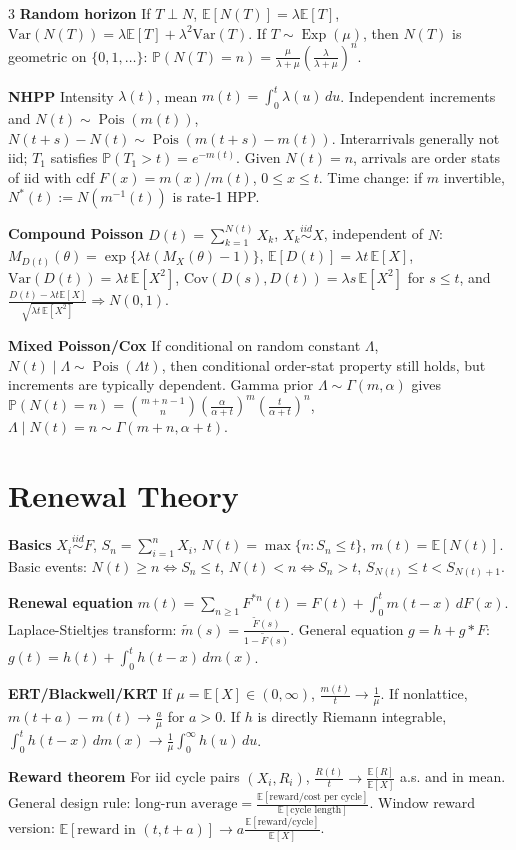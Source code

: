 \documentclass[a4paper,8pt,fleqn]{extarticle}
\newcommand{\E}{\mathbb{E}}
\newcommand{\PP}{\mathbb{P}}
\newcommand{\Var}{\mathrm{Var}}
\newcommand{\Cov}{\mathrm{Cov}}
\newcommand{\1}{\mathbf{1}}
\newcommand{\sub}[1]{\textbf{#1} }
\DeclareMathOperator{\Pois}{Pois}
\DeclareMathOperator{\Exp}{Exp}
\begin{document}
\begin{multicols}{3}
\sub{Random horizon} If \(T\perp N\), \(\E[N(T)]=\lambda \E[T]\), \(\Var(N(T))=\lambda\E[T]+\lambda^2\Var(T)\). If \(T\sim\Exp(\mu)\), then \(N(T)\) is geometric on \(\{0,1,\dots\}\): \(\PP(N(T)=n)=\frac{\mu}{\lambda+\mu}(\frac{\lambda}{\lambda+\mu})^n\).

\sub{NHPP} Intensity \(\lambda(t)\), mean \(m(t)=\int_0^t\lambda(u)\,du\). Independent increments and \(N(t)\sim \Pois(m(t))\), \(N(t+s)-N(t)\sim \Pois(m(t+s)-m(t))\). Interarrivals generally not iid; \(T_1\) satisfies \(\PP(T_1>t)=e^{-m(t)}\). Given \(N(t)=n\), arrivals are order stats of iid with cdf \(F(x)=m(x)/m(t)\), \(0\le x\le t\). Time change: if \(m\) invertible, \(N^*(t):=N(m^{-1}(t))\) is rate-1 HPP.

\sub{Compound Poisson} \(D(t)=\sum_{k=1}^{N(t)}X_k\), \(X_k\stackrel{iid}{\sim}X\), independent of \(N\): \(M_{D(t)}(\theta)=\exp\{\lambda t(M_X(\theta)-1)\}\), \(\E[D(t)]=\lambda t\,\E[X]\), \(\Var(D(t))=\lambda t\,\E[X^2]\), \(\Cov(D(s),D(t))=\lambda s\,\E[X^2]\) for \(s\le t\), and \(\frac{D(t)-\lambda t\E[X]}{\sqrt{\lambda t\,\E[X^2]}}\Rightarrow N(0,1)\).

\sub{Mixed Poisson/Cox} If conditional on random constant \(\Lambda\), \(N(t)\mid \Lambda\sim \Pois(\Lambda t)\), then conditional order-stat property still holds, but increments are typically dependent. Gamma prior \(\Lambda\sim \Gamma(m,\alpha)\) gives \(\PP(N(t)=n)=\binom{m+n-1}{n}(\frac{\alpha}{\alpha+t})^m(\frac{t}{\alpha+t})^n\), \(\Lambda\mid N(t)=n\sim \Gamma(m+n,\alpha+t)\).

\section*{Renewal Theory}
\sub{Basics} \(X_i\stackrel{iid}{\sim}F\), \(S_n=\sum_{i=1}^n X_i\), \(N(t)=\max\{n:S_n\le t\}\), \(m(t)=\E[N(t)]\). Basic events: \(N(t)\ge n \iff S_n\le t\), \(N(t)<n \iff S_n>t\), \(S_{N(t)}\le t<S_{N(t)+1}\).

\sub{Renewal equation} \(m(t)=\sum_{n\ge1}F^{*n}(t)=F(t)+\int_0^t m(t-x)\,dF(x)\). Laplace-Stieltjes transform: \(\tilde m(s)=\frac{\tilde F(s)}{1-\tilde F(s)}\). General equation \(g=h+g*F\): \(g(t)=h(t)+\int_0^t h(t-x)\,dm(x)\).

\sub{ERT/Blackwell/KRT} If \(\mu=\E[X]\in(0,\infty)\), \(\frac{m(t)}{t}\to \frac{1}{\mu}\). If nonlattice, \(m(t+a)-m(t)\to \frac{a}{\mu}\) for \(a>0\). If \(h\) is directly Riemann integrable, \(\int_0^t h(t-x)\,dm(x)\to \frac{1}{\mu}\int_0^\infty h(u)\,du\).

\sub{Reward theorem} For iid cycle pairs \((X_i,R_i)\), \(\frac{R(t)}{t}\to \frac{\E[R]}{\E[X]}\) a.s. and in mean. General design rule: \(\text{long-run average}=\frac{\E[\text{reward/cost per cycle}]}{\E[\text{cycle length}]}\). Window reward version: \(\E[\text{reward in }(t,t+a)]\to a\frac{\E[\text{reward/cycle}]}{\E[X]}\).


\end{multicols}
\end{document}
